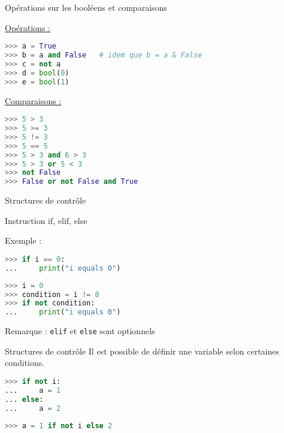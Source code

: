 \begin{frame}[fragile]{Opérations sur les booléens et comparaisons}

  \underline{Opérations :}

\begin{lstlisting}[language=Python, morekeywords={True, false}, numbers=none]
>>> a = True
>>> b = a and False   # idem que b = a & False
>>> c = not a
>>> d = bool(0)
>>> e = bool(1)
\end{lstlisting}
  
    \underline{Comparaisons :}
    \medskip
\begin{lstlisting}[language=Python, morekeywords={True, false}, numbers=none]
>>> 5 > 3
>>> 5 >= 3
>>> 5 != 3
>>> 5 == 5
>>> 5 > 3 and 6 > 3
>>> 5 > 3 or 5 < 3
>>> not False
>>> False or not False and True
\end{lstlisting}
\end{frame}

\begin{frame}[fragile]{Structures de contrôle}
  \begin{block}{Instruction if, elif, else}
  \medskip  

  Exemple :
  \begin{overprint}
\begin{lstlisting}[language=Python, morekeywords={True, false}, numbers=none]
>>> if i == 0:
...     print("i equals 0")
\end{lstlisting}

\begin{lstlisting}[language=Python, morekeywords={True, false}, numbers=none]
>>> i = 0
>>> condition = i != 0
>>> if not condition:
...     print("i equals 0")
\end{lstlisting}
  \end{overprint}


  \end{block}

  Remarque : \texttt{elif} et \texttt{else} sont optionnels
\end{frame}

\begin{frame}[fragile]{Structures de contrôle}
  Il est possible de définir une variable selon certaines conditions.
\begin{lstlisting}[language=Python, numbers=none]
>>> if not i:
...     a = 1
... else:
...     a = 2
\end{lstlisting}

\begin{lstlisting}[language=Python, numbers=none]
>>> a = 1 if not i else 2
\end{lstlisting}
\end{frame}

